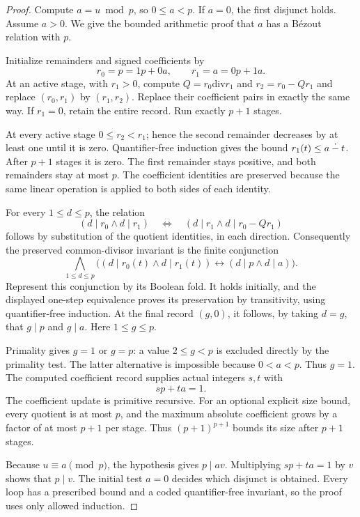 \begin{proof}
Compute $a=u\bmod p$, so $0\le a<p$. If $a=0$, the first disjunct holds.
Assume $a>0$. We give the bounded arithmetic proof that $a$ has a
B\'ezout relation with $p$.

Initialize remainders and signed coefficients by
\[
 r_0=p=1p+0a,\qquad r_1=a=0p+1a.
\]
At an active stage, with $r_1>0$, compute
$Q=r_0\mathbin{\mathrm{div}}r_1$ and $r_2=r_0-Qr_1$ and replace
$(r_0,r_1)$ by $(r_1,r_2)$. Replace their coefficient pairs in exactly the
same way. If $r_1=0$, retain the entire record. Run exactly $p+1$ stages.

At every active stage $0\le r_2<r_1$; hence the second remainder decreases
by at least one until it is zero. Quantifier-free induction gives the bound
$r_1(t)\le a\mathbin{\dot{-}} t$. After $p+1$ stages it is zero. The first remainder
stays positive, and both remainders stay at most $p$. The coefficient
identities are preserved because the same linear operation is applied to
both sides of each identity.

For every $1\le d\le p$, the relation
\[
 (d\mid r_0\land d\mid r_1)
 \quad\Longleftrightarrow\quad
 (d\mid r_1\land d\mid r_0-Qr_1)
\]
follows by substitution of the quotient identities, in each direction.
Consequently the preserved common-divisor invariant is the finite conjunction
\[
 \bigwedge_{1\le d\le p}
 \bigl((d\mid r_0(t)\land d\mid r_1(t))
       \leftrightarrow(d\mid p\land d\mid a)\bigr).
\]
Represent this conjunction by its Boolean fold. It holds initially, and
the displayed one-step equivalence proves its preservation by transitivity,
using quantifier-free induction. At the final record $(g,0)$,
it follows, by taking $d=g$, that $g\mid p$ and $g\mid a$.
Here $1\le g\le p$.

Primality gives $g=1$ or $g=p$: a value $2\le g<p$ is excluded directly
by the primality test. The latter alternative is impossible because
$0<a<p$. Thus $g=1$. The computed coefficient record supplies actual
integers $s,t$ with
\[
 sp+ta=1.
\]
The coefficient update is primitive recursive. For an optional explicit
size bound, every quotient is at most $p$, and the maximum absolute
coefficient grows by a factor of at most $p+1$ per stage. Thus
$(p+1)^{p+1}$ bounds its size after $p+1$ stages.

Because $u\equiv a\pmod p$, the hypothesis gives $p\mid av$.
Multiplying $sp+ta=1$ by $v$ shows that $p\mid v$. The initial test
$a=0$ decides which disjunct is obtained. Every loop has a prescribed
bound and a coded quantifier-free invariant, so the proof uses only
allowed induction.
\end{proof}

